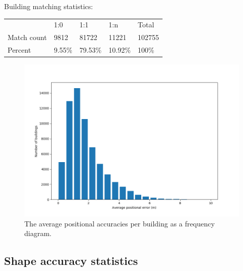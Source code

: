 \documentclass[a4paper]{article}
\begin{document}
Building matching statistics:

\begin{table}[H]
\begin{tabular}{lllll}
    & 1:0 & 1:1 & 1:n & Total \\
    Match count & 9812   & 81722   & 11221   & 102755 \\
    Percent     & 9.55\% & 79.53\% & 10.92\% & 100\%
\end{tabular}
\end{table}


\begin{figure}[H]
    \centering
    \includegraphics[width=\textwidth,height=0.5\textheight,keepaspectratio]{img_pos_error_plot}
    \caption{The average positional accuracies per building as a frequency diagram.}
    \label{fig:space}
\end{figure}

\subsection{Shape accuracy statistics}

\end{document}
